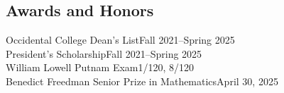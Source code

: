 \documentclass[margin, 12pt]{res} %
\begin{document}
\begin{resume}
\section{\sc Awards and Honors}
Occidental College Dean's List\hfill Fall 2021--Spring 2025\\
President's Scholarship\hfill Fall 2021--Spring 2025\\
William Lowell Putnam Exam\hfill 1/120, 8/120\\
Benedict Freedman Senior Prize in Mathematics\hfill April 30, 2025
\end{resume}
\end{document}
